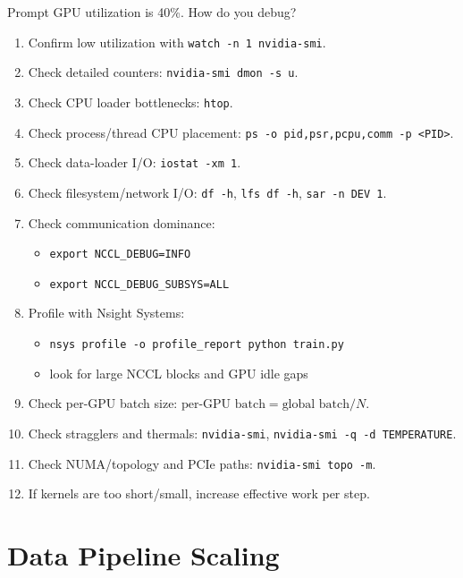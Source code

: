 \documentclass[12pt]{article}
\begin{document}
\begin{greenbox}{Prompt}
GPU utilization is 40\%. How do you debug?
\begin{enumerate}[leftmargin=1.3em]
\item Confirm low utilization with \texttt{watch -n 1 nvidia-smi}.
\item Check detailed counters: \texttt{nvidia-smi dmon -s u}.
\item Check CPU loader bottlenecks: \texttt{htop}.
\item Check process/thread CPU placement: \texttt{ps -o pid,psr,pcpu,comm -p <PID>}.
\item Check data-loader I/O: \texttt{iostat -xm 1}.
\item Check filesystem/network I/O: \texttt{df -h}, \texttt{lfs df -h}, \texttt{sar -n DEV 1}.
\item Check communication dominance:
\begin{itemize}
\item \texttt{export NCCL\_DEBUG=INFO}
\item \texttt{export NCCL\_DEBUG\_SUBSYS=ALL}
\end{itemize}
\item Profile with Nsight Systems:
\begin{itemize}
\item \texttt{nsys profile -o profile\_report python train.py}
\item look for large NCCL blocks and GPU idle gaps
\end{itemize}
\item Check per-GPU batch size: \(\text{per-GPU batch}=\text{global batch}/N\).
\item Check stragglers and thermals: \texttt{nvidia-smi}, \texttt{nvidia-smi -q -d TEMPERATURE}.
\item Check NUMA/topology and PCIe paths: \texttt{nvidia-smi topo -m}.
\item If kernels are too short/small, increase effective work per step.
\end{enumerate}
\end{greenbox}

\vspace{2cm}

\section{Data Pipeline Scaling}
\end{document}
